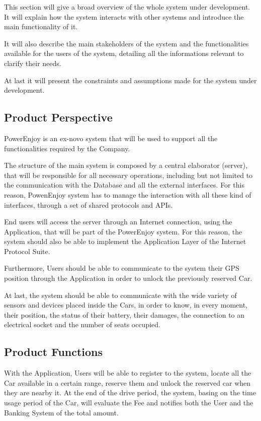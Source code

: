This section will give a broad overview of the whole system under development. It will explain how the system interacts with other systems and introduce the main functionality of it.

It will also describe the main stakeholders of the system and the functionalities available for the users of the system, detailing all the informations relevant to clarify their needs.

At last it will present the constraints and assumptions made for the system under development.

\subsection{Product Perspective}

PowerEnjoy is an ex-novo system that will be used to support all the functionalities required by the Company.

The structure of the main system is composed by a central elaborator (server), that will be responsible for all necessary operations, including but not limited to the communication with the Database and all the external interfaces. For this reason, PowenEnjoy system has to manage the interaction with all these kind of interfaces, through a set of shared protocols and APIs.

End users will access the server through an Internet connection, using the Application, that will be part of the PowerEnjoy system. For this reason, the system should also be able to implement the Application Layer of the Internet Protocol Suite.

Furthermore, Users should be able to communicate to the system their GPS position through the Application in order to unlock the previously reserved Car.

At last, the system should be able to communicate with the wide variety of sensors and devices placed inside the Cars, in order to know, in every moment, their position, the status of their battery, their damages, the connection to an electrical socket and the number of seats occupied. 



\subsection{Product Functions}
With the Application, Users will be able to register to the system, locate all the Car available in a certain range, reserve them and unlock the reserved car when they are nearby it. At the end of the drive period, the system, basing on the time usage period of the Car, will evaluate the Fee and notifies both the User and the Banking System of the total amount.

